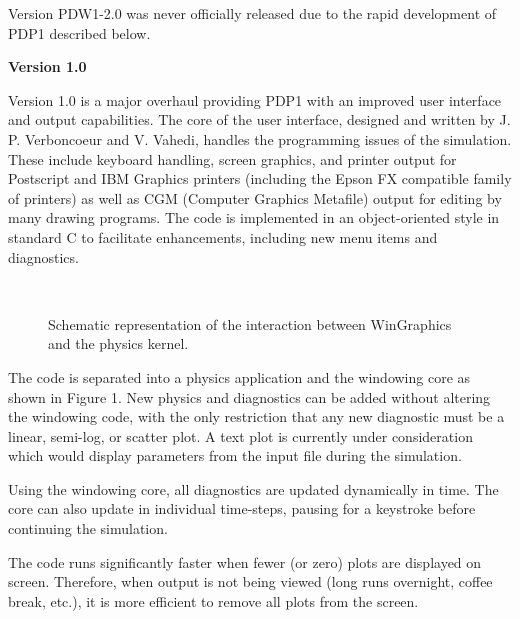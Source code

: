 \begin{section}
\begin{subsection}
\begin{subsubsection}
\noindent
      Version \mbox{PDW1-2.0} was never officially released due to the rapid
      development of \mbox{PDP1} described below.
\end{subsubsection}

\begin{subsubsection}
{\bf Version 1.0}

      Version 1.0 is a major overhaul providing PDP1 with an improved user
      interface and output capabilities.  The core of the user interface,
      designed and written by J. P. Verboncoeur and V. Vahedi\cite{kn:verb}, 
      handles the
      programming issues of the simulation.  These include keyboard handling,
      screen graphics, and printer output for Postscript and IBM Graphics
      printers (including the Epson FX compatible family of printers) as well
      as CGM (Computer Graphics Metafile) output for editing by many drawing
      programs.  The code is implemented in an object-oriented style in
      standard C to facilitate enhancements, including new menu items and
      diagnostics.
%
\begin{figure}
\begin{center}
\leavevmode
\hbox{%
\epsfysize 4.0in
\epsfxsize 4.0in
}
\end{center}
\caption{Schematic representation of the interaction between WinGraphics and the physics kernel.}
\label{PICFLOW}
\end{figure}
%
\noindent
      The code is separated into a physics application and the windowing core
      as shown in Figure 1.  New physics and diagnostics can be added without
      altering the windowing code, with the only restriction that any new
      diagnostic must be a linear, semi-log, or scatter plot.  A text plot is
      currently under consideration which would display parameters from the
      input file during the simulation.
\vspace{.2in}

\noindent
      Using the windowing core, all diagnostics are updated dynamically in
      time.  The core can also update in individual time-steps, pausing for a
      keystroke before continuing the simulation.
\vspace{.2in}

\noindent
      The code runs significantly faster when fewer (or zero) plots are
      displayed on screen.  Therefore, when output is not being viewed (long
      runs overnight, coffee break, etc.), it is more efficient to remove all
      plots from the screen.
\vspace{.2in}


\end{subsubsection}
\end{subsection}
\end{section}
